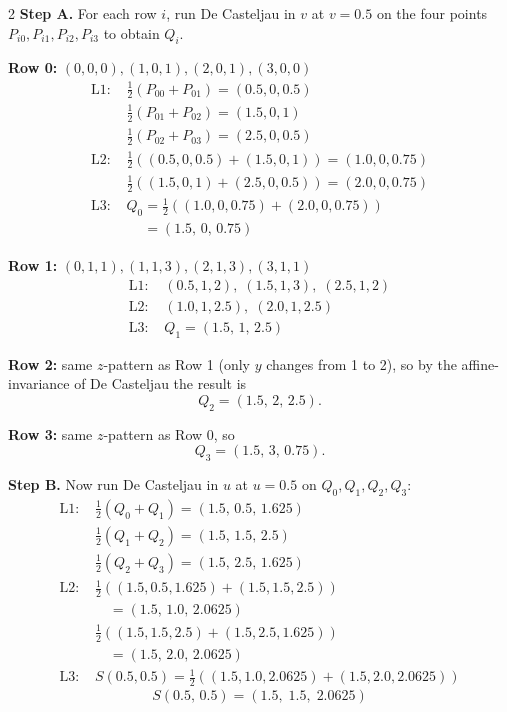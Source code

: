 \begin{paracol}{2}
\textbf{Step A.} For each row $i$, run De Casteljau in $v$ at $v=0.5$ on the four points $P_{i0},P_{i1},P_{i2},P_{i3}$ to obtain $Q_i$.

\textbf{Row 0:} $(0,0,0),(1,0,1),(2,0,1),(3,0,0)$
\begin{align*}
\text{L1: }& \tfrac{1}{2}(P_{00}{+}P_{01})=(0.5,0,0.5)\\
           & \tfrac{1}{2}(P_{01}{+}P_{02})=(1.5,0,1)\\
           & \tfrac{1}{2}(P_{02}{+}P_{03})=(2.5,0,0.5)\\
\text{L2: }& \tfrac{1}{2}((0.5,0,0.5){+}(1.5,0,1))=(1.0,0,0.75)\\
           & \tfrac{1}{2}((1.5,0,1){+}(2.5,0,0.5))=(2.0,0,0.75)\\
\text{L3: }& Q_0=\tfrac{1}{2}((1.0,0,0.75){+}(2.0,0,0.75))\\
           &\phantom{Q_0}=(1.5,\,0,\,0.75)
\end{align*}

\textbf{Row 1:} $(0,1,1),(1,1,3),(2,1,3),(3,1,1)$
\begin{align*}
\text{L1: }& (0.5,1,2),\;(1.5,1,3),\;(2.5,1,2)\\
\text{L2: }& (1.0,1,2.5),\;(2.0,1,2.5)\\
\text{L3: }& Q_1=(1.5,\,1,\,2.5)
\end{align*}

\textbf{Row 2:} same $z$-pattern as Row 1 (only $y$ changes from 1 to 2), so by the affine-invariance of De Casteljau the result is
\[
Q_2=(1.5,\,2,\,2.5).
\]

\textbf{Row 3:} same $z$-pattern as Row 0, so
\[
Q_3=(1.5,\,3,\,0.75).
\]

\textbf{Step B.} Now run De Casteljau in $u$ at $u=0.5$ on $Q_0,Q_1,Q_2,Q_3$:
\begin{align*}
\text{L1: }& \tfrac{1}{2}(Q_0{+}Q_1)=(1.5,\,0.5,\,1.625)\\
           & \tfrac{1}{2}(Q_1{+}Q_2)=(1.5,\,1.5,\,2.5)\\
           & \tfrac{1}{2}(Q_2{+}Q_3)=(1.5,\,2.5,\,1.625)\\
\text{L2: }& \tfrac{1}{2}((1.5,0.5,1.625){+}(1.5,1.5,2.5))\\
           &\quad =(1.5,\,1.0,\,2.0625)\\
           & \tfrac{1}{2}((1.5,1.5,2.5){+}(1.5,2.5,1.625))\\
           &\quad =(1.5,\,2.0,\,2.0625)\\
\text{L3: }& S(0.5,0.5)=\tfrac{1}{2}((1.5,1.0,2.0625){+}(1.5,2.0,2.0625))
\end{align*}
\[
\boxed{\,S(0.5,\,0.5)=(1.5,\;1.5,\;2.0625)\,}
\]


\end{paracol}

